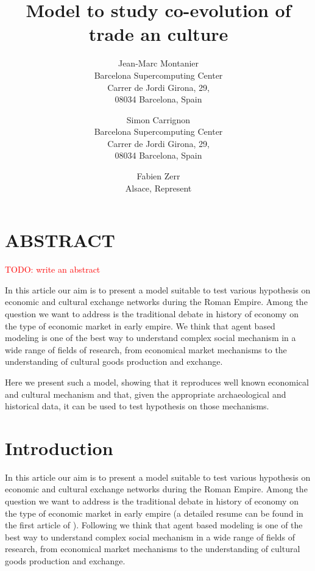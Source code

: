\documentclass{wscpaperproc}
\newcommand{\memo}[2]{\textcolor{#1}{#2}}
\newcommand{\todo}[1]{\memo{red}{TODO: #1\\}}
\begin{document}

\title{Model to study co-evolution of trade an culture}

\author{Jean-Marc Montanier\\ [12pt]
Barcelona Supercomputing Center\\
Carrer de Jordi Girona, 29, \\
08034 Barcelona, Spain\\
\and
Simon Carrignon\\ [12pt]
Barcelona Supercomputing Center\\
Carrer de Jordi Girona, 29, \\
08034 Barcelona, Spain\\
\and
Fabien Zerr\\ [12pt]
Alsace, Represent
}






\maketitle


\section*{ABSTRACT}
\todo{write an abstract}

In this article our aim is to present a model suitable to test various hypothesis on economic and cultural exchange networks during the Roman Empire. Among the question we want to address is the traditional debate in history of economy on the type of economic market in early empire. We think that agent based modeling is one of the best way to understand complex social mechanism in a wide range of fields of research, from economical market mechanisms to the understanding of cultural goods production and exchange.

Here we present such a model, showing that it reproduces well known economical and cultural mechanism and that, given the appropriate archaeological and historical data, it can be used to test hypothesis on those mechanisms.


\section{Introduction}
In this article our aim is to present a model suitable to test various hypothesis on economic and cultural exchange networks during the Roman Empire. Among the question we want to address is the traditional debate in history of economy on the type of economic market in early empire (a detailed resume can be found in the first article of \cite{polanyi_trade_1957}). Following \cite{epstein_growing_1996,lake_trends_2014,kohler_dynamics_2000,tesfatsion_agent-based_2003} we think that agent based modeling is one of the best way to understand complex social mechanism in a wide range of fields of research, from economical market mechanisms to the understanding of cultural goods production and exchange.
\end{document}
